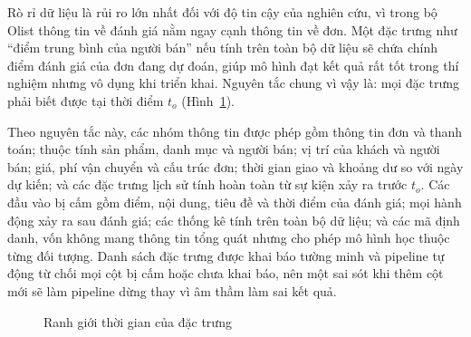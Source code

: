 Rò rỉ dữ liệu là rủi ro lớn nhất đối với độ tin cậy của nghiên cứu, vì trong bộ Olist thông tin về đánh giá nằm ngay cạnh thông tin về đơn. Một đặc trưng như ``điểm trung bình của người bán'' nếu tính trên toàn bộ dữ liệu sẽ chứa chính điểm đánh giá của đơn đang dự đoán, giúp mô hình đạt kết quả rất tốt trong thí nghiệm nhưng vô dụng khi triển khai. Nguyên tắc chung vì vậy là: mọi đặc trưng phải biết được tại thời điểm $t_o$ (Hình~\ref{fig:leakage-timeline}).

Theo nguyên tắc này, các nhóm thông tin được phép gồm thông tin đơn và thanh toán; thuộc tính sản phẩm, danh mục và người bán; vị trí của khách và người bán; giá, phí vận chuyển và cấu trúc đơn; thời gian giao và khoảng dư so với ngày dự kiến; và các đặc trưng lịch sử tính hoàn toàn từ sự kiện xảy ra trước $t_o$. Các đầu vào bị cấm gồm điểm, nội dung, tiêu đề và thời điểm của đánh giá; mọi hành động xảy ra sau đánh giá; các thống kê tính trên toàn bộ dữ liệu; và các mã định danh, vốn không mang thông tin tổng quát nhưng cho phép mô hình học thuộc từng đối tượng. Danh sách đặc trưng được khai báo tường minh và pipeline tự động từ chối mọi cột bị cấm hoặc chưa khai báo, nên một sai sót khi thêm cột mới sẽ làm pipeline dừng thay vì âm thầm làm sai kết quả.

\begin{figure}[htbp]\centering
{}
\caption{Ranh giới thời gian của đặc trưng}
\label{fig:leakage-timeline}
\end{figure}

